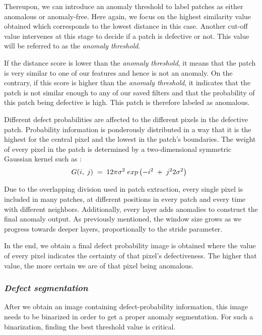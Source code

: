 \documentclass[3p,,preprint,review,12pt]{elsarticle}
\begin{document}
Thereupon, we can introduce an anomaly threshold to label patches as either anomalous or anomaly-free. Here again, we focus on the highest similarity value obtained which corresponds to the lowest distance in this case. Another cut-off value intervenes at this stage to decide if a patch is defective or not. This value will be referred to as the \textit{anomaly threshold}. 

If the distance score is lower than the \textit{anomaly threshold}, it means that the patch is very similar to one of our features and hence is not an anomaly. On the contrary, if this score is higher than the \textit{anomaly threshold}, it indicates that the patch is not similar enough to any of our saved filters and that the probability of this patch being defective is high. This patch is therefore labeled as anomalous. 

Different defect probabilities are affected to the different pixels in the defective patch. Probability information is ponderously distributed in a way that it is the highest for the central pixel and the lowest in the patch's boundaries. The weight of every pixel in the patch is determined by a two-dimensional symmetric Gaussian kernel such as :
\let\saveeqnno\theequation
\let\savefrac\frac
\def\dispfrac{\displaystyle\savefrac}
\begin{eqnarray}
\let\frac\dispfrac
\gdef\theequation{9}
\let\theHequation\theequation
\label{dfg-3bb20305deaf}
\begin{array}{@{}l}G(i,\;j)\;=\;\frac1{2\pi\sigma ^{2}}\;exp\left(-\frac{i^{2}\;+\;j^{2}}{2\sigma ^{2}}\right)\end{array}
\end{eqnarray}
\global\let\theequation\saveeqnno
\addtocounter{equation}{-1}\ignorespaces 
Due to the overlapping division used in patch extraction, every single pixel is included in many patches, at different positions in every patch and every time with different neighbors. Additionally, every layer adds anomalies to construct the final anomaly output. As previously mentioned, the window size grows as we progress towards deeper layers, proportionally to the stride parameter. 

In the end, we obtain a final defect probability image is obtained where the value of every pixel indicates the certainty of that pixel's defectiveness. The higher that value, the more certain we are of that pixel being anomalous. 



\subsubsection{\textit{Defect segmentation}}After we obtain an image containing defect-probability information, this image needs to be binarized in order to get a proper anomaly segmentation.  For such a binarization, finding the best threshold value is critical.
\end{document}
